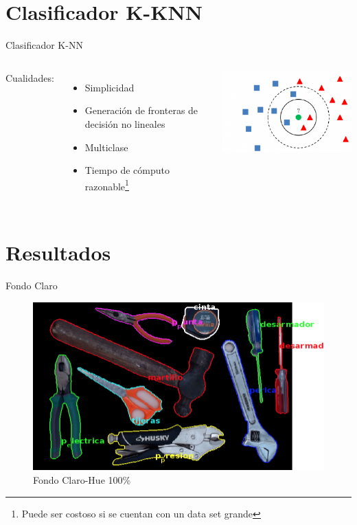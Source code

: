 \documentclass[
  24pt, %
]{beamer}
\begin{document}
\section{Clasificador K-KNN}
\begin{frame}{Clasificador K-NN}
  \begin{columns}
    Cualidades:
    
    \begin{itemize}
      \pause
    \item Simplicidad
      \pause
    \item Generación de fronteras de decisión no lineales
      \pause
    \item Multiclase
      \pause
    \item Tiempo de cómputo razonable\footnote{Puede ser costoso si se cuentan con un data set grande}
    \end{itemize}
    \includegraphics[width=\textwidth]{knn}
    
  \end{columns}
\end{frame}

\section{Resultados}
\begin{frame}{Fondo Claro}
  \begin{figure}[h]
  \centering
  \includegraphics[width=\textwidth]{resultados_colores/resultado_claro_hue_1}
  \caption{Fondo Claro-Hue 100\%}
  \end{figure}
\end{frame}
\end{document}
